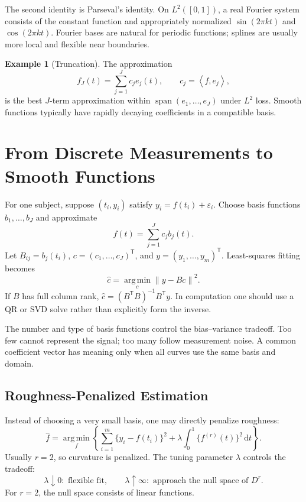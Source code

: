 \documentclass[12pt,oneside]{book}
\numberwithin{equation}{section}
\theoremstyle{definition}
\newtheorem{example}{Example}[section]
\theoremstyle{plain}
\theoremstyle{remark}
\newcommand{\argmin}{\operatorname*{arg\,min}}
\newcommand{\norm}[1]{\left\lVert #1 \right\rVert}
\newcommand{\inner}[2]{\left\langle #1, #2 \right\rangle}
\newcommand{\dd}{\,\mathrm{d}}
\begin{document}
The second identity is Parseval's identity. On $L^2([0,1])$, a real Fourier
system consists of the constant function and appropriately normalized
$\sin(2\pi kt)$ and $\cos(2\pi kt)$. Fourier bases are natural for periodic
functions; splines are usually more local and flexible near boundaries.

\begin{example}[Truncation]
The approximation
\[
    f_J(t)=\sum_{j=1}^Jc_je_j(t),\qquad c_j=\inner f{e_j},
\]
is the best $J$-term approximation within
$\operatorname{span}(e_1,\ldots,e_J)$ under $L^2$ loss. Smooth functions
typically have rapidly decaying coefficients in a compatible basis.
\end{example}

\section{From Discrete Measurements to Smooth Functions}

For one subject, suppose $(t_i,y_i)$ satisfy
$y_i=f(t_i)+\varepsilon_i$. Choose basis functions
$b_1,\ldots,b_J$ and approximate
\[
    f(t)=\sum_{j=1}^Jc_jb_j(t).
\]
Let $B_{ij}=b_j(t_i)$, $c=(c_1,\ldots,c_J)^\mathsf T$, and
$y=(y_1,\ldots,y_m)^\mathsf T$. Least-squares fitting becomes
\begin{equation}
    \widehat c=\argmin_c\norm{y-Bc}^2.
    \label{eq:fda-basis-ls}
\end{equation}
If $B$ has full column rank,
$\widehat c=(B^\mathsf TB)^{-1}B^\mathsf Ty$. In computation one should use a
QR or SVD solve rather than explicitly form the inverse.

The number and type of basis functions control the bias--variance tradeoff.
Too few cannot represent the signal; too many follow measurement noise. A
common coefficient vector has meaning only when all curves use the same basis
and domain.

\subsection{Roughness-Penalized Estimation}

Instead of choosing a very small basis, one may directly penalize roughness:
\begin{equation}
 \widehat f=\argmin_f
 \left\{\sum_{i=1}^m\{y_i-f(t_i)\}^2
 +\lambda\int_0^1\{f^{(r)}(t)\}^2\dd t\right\}.
 \label{eq:fda-roughness}
\end{equation}
Usually $r=2$, so curvature is penalized. The tuning parameter $\lambda$
controls the tradeoff:
\[
 \lambda\downarrow0:\text{ flexible fit},\qquad
 \lambda\uparrow\infty:\text{ approach the null space of }D^r.
\]
For $r=2$, the null space consists of linear functions.
\end{document}

